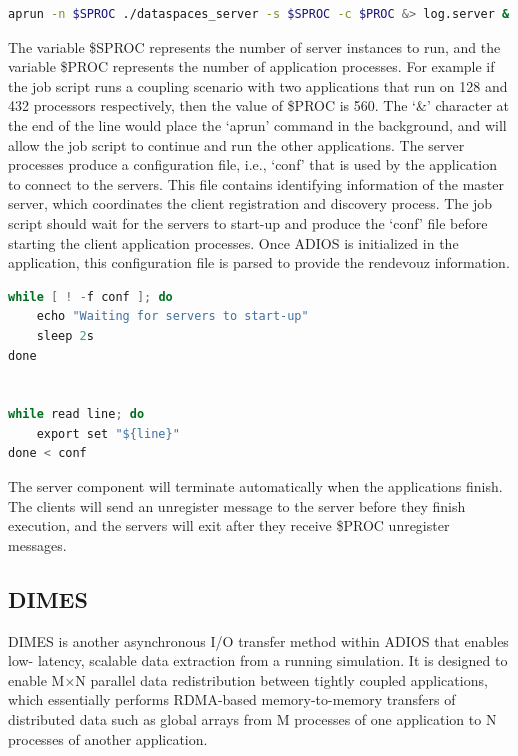 \begin{lstlisting}[language=bash, caption=Start the server component in a job file first.]
aprun -n $SPROC ./dataspaces_server -s $SPROC -c $PROC &> log.server &
\end{lstlisting}

The variable \$SPROC represents the number of server instances to run, and the 
variable \$PROC represents the number of application processes. For example if 
the job script runs a coupling scenario with two applications that run on 128 and 
432 processors respectively, then the value of \$PROC is 560. The `\&' character 
at the end of the line would place the `aprun' command in the background, and will 
allow the job script to continue and run the other applications. The server processes 
produce a configuration file, i.e., `conf' that is used by the application  
to connect to the servers. This file contains identifying information of the 
master server, which coordinates the client registration 
and discovery process. The job script should wait for the servers to start-up and 
produce the `conf' file before starting the client application processes. 
Once ADIOS is initialized in the application, this configuration file is parsed
to provide the rendevouz information. 

\begin{lstlisting}[language=C, caption=Wait for server start-up completion and export the configuration to environment variables.]
while [ ! -f conf ]; do
	echo "Waiting for servers to start-up"
	sleep 2s
done


while read line; do
	export set "${line}"
done < conf
\end{lstlisting}

The server component will terminate automatically when the applications finish. 
The clients  will send an unregister message to the server before 
they finish execution, and the servers will exit after they receive \$PROC unregister 
messages.


\subsection{DIMES}
\label{section-method-dimes}
DIMES is another asynchronous I/O transfer method within ADIOS that enables low-
latency, scalable data extraction from a running simulation. It is designed to enable M$
\times$N parallel data redistribution between tightly coupled applications, which 
essentially performs RDMA-based memory-to-memory transfers of distributed data such 
as global arrays from M processes of one application to N processes of another application.


